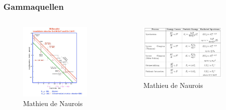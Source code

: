 \documentclass[aspectratio=1610, professionalfonts, 9pt]{beamer}
\begin{document}
  \begin{frame}
    \frametitle{Gammaquellen}
    \begin{columns}
      \begin{figure}
        \includegraphics[width=0.9\textwidth]{pictures/gamma_sources.JPG}
        \caption{Mathieu de Naurois}
        \label{}
      \end{figure}
      \begin{figure}
        \includegraphics[width=0.9\textwidth]{pictures/gammaprocess.JPG}
        \caption{Mathieu de Naurois}
        \label{}
      \end{figure}
    \end{columns}

  \end{frame}
\end{document}
